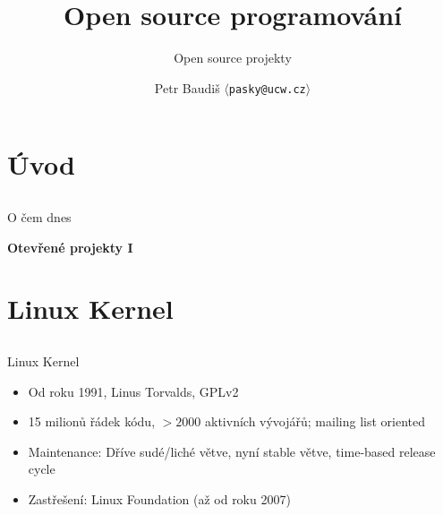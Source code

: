 \documentclass{beamer}
\begin{document}

\title{Open source programování}
\subtitle{Open source projekty}
\author{Petr Baudiš $\langle${\tt pasky@ucw.cz}$\rangle$}
\date{}
\frame{\titlepage}

\section{Úvod}

\subsection{}
\begin{frame}{O čem dnes}
\begin{center}
{\bf Otevřené projekty I}
\end{center}
\end{frame}


\section{Linux Kernel}

\subsection{}
\begin{frame}{Linux Kernel}
\begin{itemize}
\item Od roku 1991, Linus Torvalds, GPLv2
\item 15 milionů řádek kódu, $> 2000$ aktivních vývojářů; mailing list oriented
\item Maintenance: Dříve sudé/liché větve, nyní stable větve, time-based release cycle
\item Zastřešení: Linux Foundation (až od roku 2007)
\end{itemize}
\end{frame}
\end{document}
